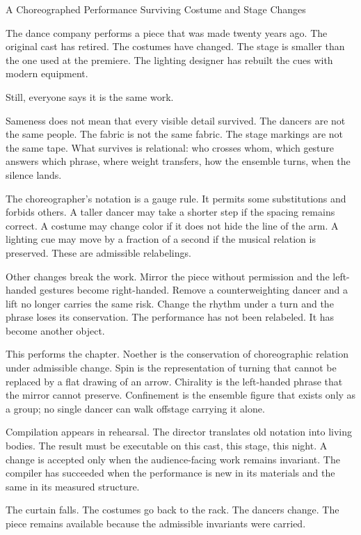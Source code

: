 \begin{coda}{A Choreographed Performance Surviving Costume and Stage Changes}

The dance company performs a piece that was made twenty years ago. The original
cast has retired. The costumes have changed. The stage is smaller than the one
used at the premiere. The lighting designer has rebuilt the cues with modern
equipment.

Still, everyone says it is the same work.

Sameness does not mean that every visible detail survived. The dancers are not
the same people. The fabric is not the same fabric. The stage markings are not
the same tape. What survives is relational: who crosses whom, which gesture
answers which phrase, where weight transfers, how the ensemble turns, when the
silence lands.

The choreographer's notation is a gauge rule. It permits some substitutions
and forbids others. A taller dancer may take a shorter step if the spacing
remains correct. A costume may change color if it does not hide the line of the
arm. A lighting cue may move by a fraction of a second if the musical relation
is preserved. These are admissible relabelings.

Other changes break the work. Mirror the piece without permission and the
left-handed gestures become right-handed. Remove a counterweighting dancer and
a lift no longer carries the same risk. Change the rhythm under a turn and the
phrase loses its conservation. The performance has not been relabeled. It has
become another object.

This performs the chapter. Noether is the conservation of choreographic
relation under admissible change. Spin is the representation of turning that
cannot be replaced by a flat drawing of an arrow. Chirality is the left-handed
phrase that the mirror cannot preserve. Confinement is the ensemble figure that
exists only as a group; no single dancer can walk offstage carrying it alone.

Compilation appears in rehearsal. The director translates old notation into
living bodies. The result must be executable on this cast, this stage, this
night. A change is accepted only when the audience-facing work remains
invariant. The compiler has succeeded when the performance is new in its
materials and the same in its measured structure.

The curtain falls. The costumes go back to the rack. The dancers change. The
piece remains available because the admissible invariants were carried.

\end{coda}
